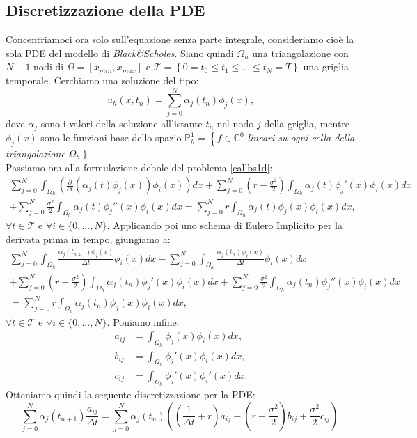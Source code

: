 \documentclass[a4paper,10pt]{report}
\theoremstyle{plain}
\theoremstyle{definition}
\theoremstyle{remark}
\begin{document}
\subsection{Discretizzazione della PDE}
Concentriamoci ora solo sull'equazione senza parte integrale, consideriamo cio\`e la sola PDE del modello di \emph{Black\&Scholes}. Siano quindi $\Omega_h$ una triangolazione con $N+1$ nodi di $\Omega=[x_{min},x_{max}]$ e $\mathcal{T}=\left\{0= t_0\leq t_1\leq ... \leq t_N=T\right\}$ una griglia temporale. Cerchiamo una soluzione del tipo: $$u_h(x,t_n)=\sum_{j=0}^{N}\alpha_j(t_n)\phi_j(x),$$ dove $\alpha_j$ sono i valori della soluzione all'istante $t_n$ nel nodo $j$ della griglia, mentre $\phi_j(x)$ sono le funzioni base dello spazio $\mathbb{P}_h^1=\left\{f\in\mathbb{C}^0\right.$ \emph{lineari su ogni cella della triangolazione} $\Omega_h\left.\right\}$.\\Passiamo ora alla formulazione debole del problema \ref{callbs1d}:
\begin{multline}
\sum_{j=0}^{N}\int_{\Omega_h}\left(\frac{\partial}{\partial t}(\alpha_j(t)\phi_j(x))\phi_i(x)\right)dx+\sum_{j=0}^{N}\left(r-\frac{\sigma^2}{2}\right)\int_{\Omega_h}\alpha_j(t)\phi_j'(x)\phi_i(x)dx\\
+\sum_{j=0}^{N}\frac{\sigma^2}{2}\int_{\Omega_h}\alpha_j(t)\phi_j''(x)\phi_i(x)dx=\sum_{j=0}^{N}r\int_{\Omega_h}\alpha_j(t)\phi_j(x)\phi_i(x)dx,
\end{multline}
$\forall t\in\mathcal{T}$ e $\forall i\in\{0,...,N\}$. Applicando poi uno schema di Eulero Implicito per la derivata prima in tempo, giungiamo a:
\begin{multline}
\sum_{j=0}^{N}\int_{\Omega_h}\frac{\alpha_j(t_{n+1})\phi_j(x)}{\Delta t}\phi_i(x)dx-\sum_{j=0}^{N}\int_{\Omega_h}\frac{\alpha_j(t_n)\phi_j(x)}{\Delta t}\phi_i(x)dx\\
+\sum_{j=0}^{N}\left(r-\frac{\sigma^2}{2}\right)\int_{\Omega_h}\alpha_j(t_n)\phi_j'(x)\phi_i(x)dx+\sum_{j=0}^{N}\frac{\sigma^2}{2}\int_{\Omega_h}\alpha_j(t_n)\phi_j''(x)\phi_i(x)dx\\
=\sum_{j=0}^{N}r\int_{\Omega_h}\alpha_j(t_n)\phi_j(x)\phi_i(x)dx,
\end{multline}
$\forall t\in\mathcal{T}$ e $\forall i\in\{0,...,N\}$. Poniamo infine:
\begin{align*}
a_{ij}&=\int_{\Omega_h}\phi_j(x)\phi_i(x)dx,\\
b_{ij}&=\int_{\Omega_h}\phi_j'(x)\phi_i(x)dx,\\
c_{ij}&=\int_{\Omega_h}\phi_j'(x)\phi_i'(x)dx.
\end{align*}
Otteniamo quindi la seguente discretizzazione per la PDE:$$\sum_{j=0}^{N}\alpha_j(t_{n+1})\frac{a_{ij}}{\Delta t}=\sum_{j=0}^{N}\alpha_j(t_{n})\left(\left(\frac{1}{\Delta t}+r\right)a_{ij}-\left(r-\frac{\sigma^2}{2}\right)b_{ij}+\frac{\sigma^2}{2}c_{ij}\right).$$
\end{document}
